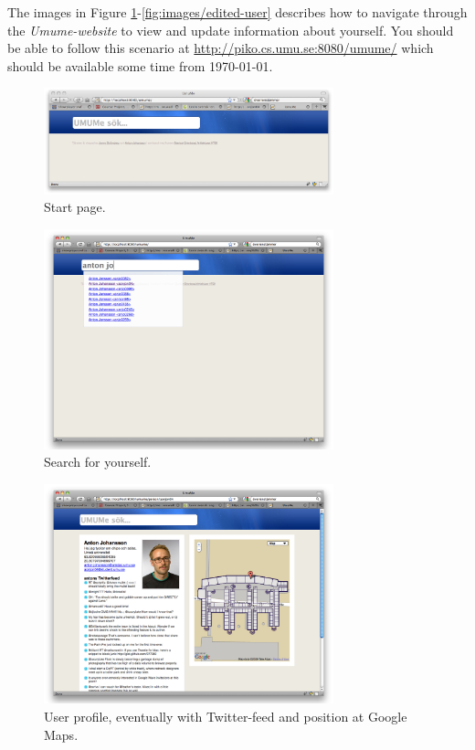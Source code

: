 \documentclass[titlepage, twocolumn, a4paper, 10pt]{article}
\begin{document}
The images in Figure
\ref{fig:images/startpage}-\vref{fig:images/edited-user} describes how
to navigate through the \textit{Umume-website} to view and update
information about yourself. You should be able to follow this scenario
at \url{http://piko.cs.umu.se:8080/umume/} which should be available
some time from \today.
\newpage
\begin{figure}[H]
  \centering
  \includegraphics[width=3.3in]{images/pic1.png}
  \caption{Start page.}
  \label{fig:images/startpage}
\end{figure}

\begin{figure}[H]
  \centering
  \includegraphics[width=3.3in]{images/pic2.png}
  \caption{Search for yourself.}
  \label{fig:images/search}
\end{figure}

\begin{figure}[H]
  \centering
  \includegraphics[width=3.3in]{images/pic3.png}
  \caption{User profile, eventually with Twitter-feed and position at Google Maps.}
  \label{fig:images/person}
\end{figure}
\end{document}
